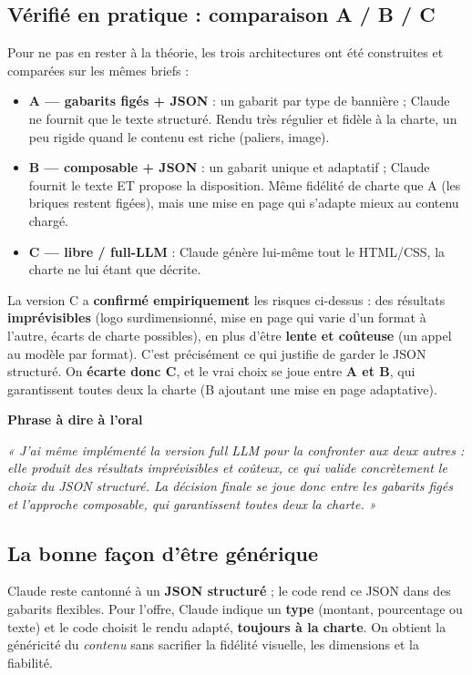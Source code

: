 \documentclass[11pt,a4paper]{article}
\newcommand{\phrasea}[1]{%
  \begin{phrasebox}
  {\bfseries\color{gefblue}\textsf{Phrase à dire à l'oral}}\par\smallskip
  \itshape #1
  \end{phrasebox}%
}
\begin{document}
\subsection{Vérifié en pratique : comparaison A / B / C}
Pour ne pas en rester à la théorie, les trois architectures ont été construites et
comparées sur les mêmes briefs :
\begin{itemize}[leftmargin=1.4em]
  \item \textbf{A — gabarits figés + JSON} : un gabarit par type de bannière ; Claude
        ne fournit que le texte structuré. Rendu très régulier et fidèle à la charte,
        un peu rigide quand le contenu est riche (paliers, image).
  \item \textbf{B — composable + JSON} : un gabarit unique et adaptatif ; Claude fournit
        le texte ET propose la disposition. Même fidélité de charte que A (les briques
        restent figées), mais une mise en page qui s'adapte mieux au contenu chargé.
  \item \textbf{C — libre / full-LLM} : Claude génère lui-même tout le HTML/CSS, la
        charte ne lui étant que décrite.
\end{itemize}
La version C a \textbf{confirmé empiriquement} les risques ci-dessus : des résultats
\textbf{imprévisibles} (logo surdimensionné, mise en page qui varie d'un format à
l'autre, écarts de charte possibles), en plus d'être \textbf{lente et coûteuse} (un
appel au modèle par format). C'est précisément ce qui justifie de garder le JSON
structuré. On \textbf{écarte donc C}, et le vrai choix se joue entre \textbf{A et B},
qui garantissent toutes deux la charte (B ajoutant une mise en page adaptative).

\phrasea{« J'ai même implémenté la version full LLM pour la confronter aux deux autres :
elle produit des résultats imprévisibles et coûteux, ce qui valide concrètement le
choix du JSON structuré. La décision finale se joue donc entre les gabarits figés et
l'approche composable, qui garantissent toutes deux la charte. »}

\subsection{La bonne façon d'être générique}
Claude reste cantonné à un \textbf{JSON structuré} ; le code rend ce JSON dans des
gabarits flexibles. Pour l'offre, Claude indique un \textbf{type}
(montant, pourcentage ou texte) et le code choisit le rendu adapté, \textbf{toujours
à la charte}. On obtient la généricité du \emph{contenu} sans sacrifier la fidélité
visuelle, les dimensions et la fiabilité.
\end{document}
